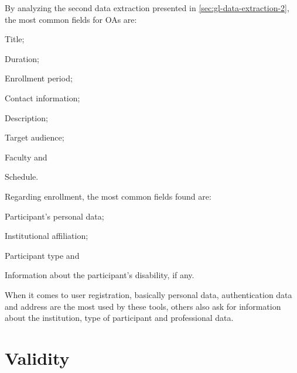 \begin{itemize}
        By analyzing the second data extraction presented in \autoref{sec:gl-data-extraction-2}, the most common fields for \acp{OA} are:
        \begin{inparaenum}[(a)]
          \item Title;
          \item Duration;
          \item Enrollment period;
          \item Contact information;
          \item Description;
          \item Target audience;
          \item Faculty and
          \item Schedule.
        \end{inparaenum}

        Regarding enrollment, the most common fields found are:
        \begin{inparaenum}[(a)]
          \item Participant's personal data;
          \item Institutional affiliation;
          \item Participant type and
          \item Information about the participant's disability, if any.
        \end{inparaenum}

        When it comes to user registration, basically personal data, authentication data and address are the most used by these tools, others also ask for information about the institution, type of participant and professional data.
\end{itemize}

\section{Validity}\label{sec:gl-validity}

